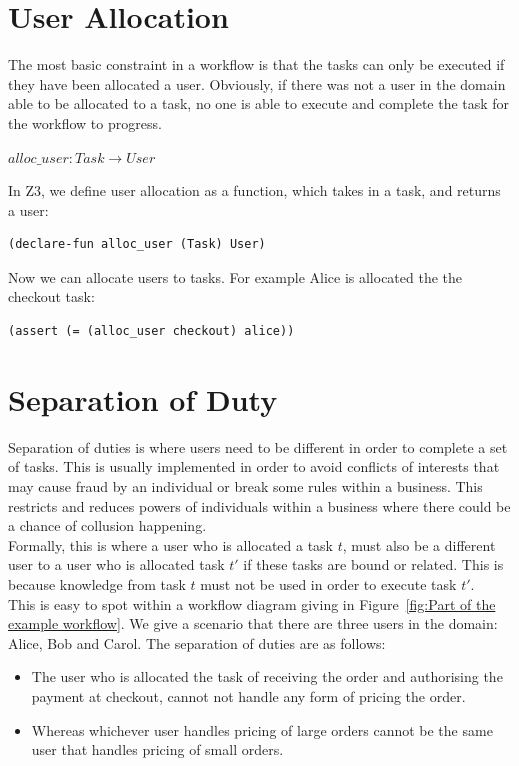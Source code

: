 \documentclass[a4paper]{report}
\begin{document}
\section{User Allocation}
The most basic constraint in a workflow is that the tasks can only be executed if they have been allocated a user. Obviously, if there was not a user in the domain able to be allocated to a task, no one is able to execute and complete the task for the workflow to progress.
\begin{center}
$alloc\_user : Task \rightarrow User$
\end{center}
In Z3, we define user allocation as a function, which takes in a task, and returns a user:
\lstset{showspaces=false,
    showstringspaces=false, tabsize=2, breaklines=true,
    xleftmargin=5.0ex,
}
\begin{lstlisting}[frame=single]
(declare-fun alloc_user (Task) User)
\end{lstlisting}

Now we can allocate users to tasks. For example Alice is allocated the the checkout task:
\lstset{showspaces=false,
    showstringspaces=false, tabsize=2, breaklines=true,
    xleftmargin=5.0ex,
}
\begin{lstlisting}[frame=single]
(assert (= (alloc_user checkout) alice))
\end{lstlisting}

\section{Separation of Duty}
Separation of duties\cite{sod} is where users need to be different in order to complete a set of tasks. This is usually implemented in order to avoid conflicts of interests that may cause fraud by an individual or break some rules within a business. This restricts and reduces powers of individuals within a business where there could be a chance of collusion happening. \\

Formally, this is where a user who is allocated a task $t$, must also be a different user to a user who is allocated task $t\ensuremath{'}$ if these tasks are bound or related. This is because knowledge from task $t$ must not be used in order to execute task $t\ensuremath{'}$. \\

This is easy to spot within a workflow diagram giving in Figure~\ref{fig:Part of the example workflow}. We give a scenario that there are three users in the domain: Alice, Bob and Carol. The separation of duties are as follows: 
\begin{itemize}
\item The user who is allocated the task of receiving the order and authorising the payment at checkout,  cannot not handle any form of pricing the order.
\item Whereas whichever user handles pricing of large orders cannot be the same user that handles pricing of small orders.
\end{itemize}
\end{document}
